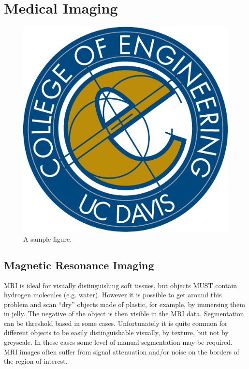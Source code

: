 \chapter{Medical Imaging}
%
\begin{figure}[tbh]
\centering
\includegraphics{ucdavisthesis_example_figure}
\caption[First sample figure]{A sample figure.}
\label{fig.sample_1}
\end{figure}

\section{Magnetic Resonance Imaging}
\label{Magnetic Resonance Imaging}

MRI is ideal for visually distinguishing soft tissues, but objects MUST contain hydrogen molecules (e.g. water). However it is possible to get around this problem and scan “dry” objects made of plastic, for example, by immersing them in jelly. The negative of the object is then visible in the MRI data. Segmentation can be threshold based in some cases. Unfortunately it is quite common for different objects to be easily distinguishable visually, by texture, but not by greyscale. In these cases some level of manual segmentation may be required. MRI images often suffer from signal attenuation and/or noise on the borders of the region of interest. \\

